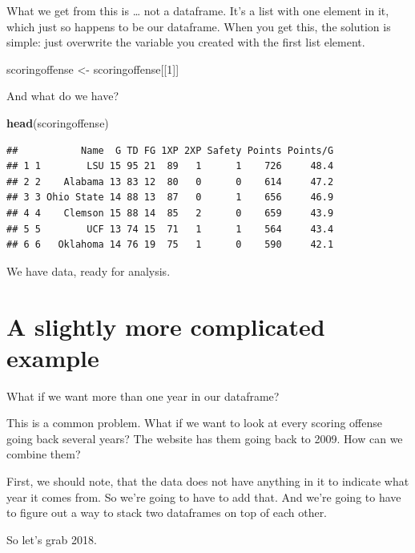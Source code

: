 \documentclass[
]{book}
\newenvironment{Shaded}{\begin{snugshade}}{\end{snugshade}}
\newcommand{\DecValTok}[1]{\textcolor[rgb]{0.00,0.00,0.81}{#1}}
\newcommand{\KeywordTok}[1]{\textcolor[rgb]{0.13,0.29,0.53}{\textbf{#1}}}
\newcommand{\NormalTok}[1]{#1}
\newcommand{\StringTok}[1]{\textcolor[rgb]{0.31,0.60,0.02}{#1}}
\begin{document}
What we get from this is \ldots{} not a dataframe. It's a list with one element in it, which just so happens to be our dataframe. When you get this, the solution is simple: just overwrite the variable you created with the first list element.

\begin{Shaded}
\begin{Highlighting}[]
\NormalTok{scoringoffense <-}\StringTok{ }\NormalTok{scoringoffense[[}\DecValTok{1}\NormalTok{]]}
\end{Highlighting}
\end{Shaded}

And what do we have?

\begin{Shaded}
\begin{Highlighting}[]
\KeywordTok{head}\NormalTok{(scoringoffense)}
\end{Highlighting}
\end{Shaded}

\begin{verbatim}
##           Name  G TD FG 1XP 2XP Safety Points Points/G
## 1 1        LSU 15 95 21  89   1      1    726     48.4
## 2 2    Alabama 13 83 12  80   0      0    614     47.2
## 3 3 Ohio State 14 88 13  87   0      1    656     46.9
## 4 4    Clemson 15 88 14  85   2      0    659     43.9
## 5 5        UCF 13 74 15  71   1      1    564     43.4
## 6 6   Oklahoma 14 76 19  75   1      0    590     42.1
\end{verbatim}

We have data, ready for analysis.

\hypertarget{a-slightly-more-complicated-example}{%
\section{A slightly more complicated example}\label{a-slightly-more-complicated-example}}

What if we want more than one year in our dataframe?

This is a common problem. What if we want to look at every scoring offense going back several years? The website has them going back to 2009. How can we combine them?

First, we should note, that the data does not have anything in it to indicate what year it comes from. So we're going to have to add that. And we're going to have to figure out a way to stack two dataframes on top of each other.

So let's grab 2018.
\end{document}
